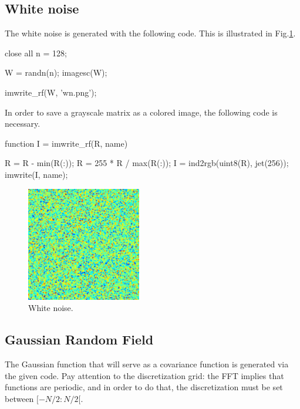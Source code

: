 \def\QRCODE{MASTER_mispa_TUT.IMG.gaussian_random_fields_matlabqrcode.png}
\def\QRPAGE{http://www.iptutorials.science/tree/master/MASTER_mispa/TUT.IMG.gaussian_random_fields/matlab}
\def\difficulty{3}

\subsection{White noise}
The white noise is generated with the following code. This is illustrated in Fig.\ref{fig:grf:matlab:wn}.
\begin{matlab}
close all
n = 128;

W = randn(n);
imagesc(W);

imwrite_rf(W, 'wn.png');
\end{matlab}

In order to save a grayscale matrix as a colored image, the following code is necessary.
\begin{matlab}
function I = imwrite_rf(R, name)
%
%

R = R - min(R(:));
R = 255 * R / max(R(:));
I = ind2rgb(uint8(R), jet(256));
imwrite(I, name);
\end{matlab}

\begin{figure}[htbp]
 \centering
 \includegraphics[width=5cm]{wn.png}
 \caption{White noise.}
 \label{fig:grf:matlab:wn}
\end{figure}

\subsection{Gaussian Random Field}
The Gaussian function that will serve as a covariance function is generated via the given code. Pay attention to the discretization grid: 
the FFT implies that functions are periodic, and in order to do that, the discretization must be set between $[-N/2:N/2[$.

